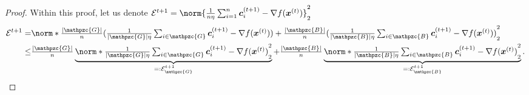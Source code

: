 \documentclass{article}
\newcommand{\gset}{\ensuremath{{\mathpzc{G}}}}
\newcommand{\bset}{\ensuremath{{\mathpzc{B}}}}
\begin{document}
\begin{proof}
  Within this proof, let us denote $\cE^{t+1}=\norm{ \tfrac{1}{n\eta} \tsum_{i=1}^n \cc_i^{(t+1)}  - \nabla f(\xx^{(t)}) }_2^2$
  \begin{align*}
    \cE^{t+1} = & \norm*{ \tfrac{|\gset|}{n} ( \tfrac{1}{|\gset|\eta} \tsum_{i\in\gset} \cc_i^{(t+1)}  - \nabla f(\xx^{(t)})) + \tfrac{|\bset|}{n} (\tfrac{1}{|\bset|\eta}\tsum_{i\in\bset} \cc_i^{(t+1)}  - \nabla f(\xx^{(t)})) }_2^2 \\
    \le         & \tfrac{|\gset|}{n} \underbrace{ \norm*{ \tfrac{1}{|\gset|\eta}  \tsum_{i\in\gset} \cc_i^{(t+1)}  - \nabla f(\xx^{(t)})  }_2^2 }_{=: \cE^{t+1}_{\gset} }
    + \tfrac{|\bset|}{n} \underbrace{\norm*{ \tfrac{1}{|\bset|\eta} \tsum_{i\in\bset} \cc_i^{(t+1)}  - \nabla f(\xx^{(t)}) }_2^2 }_{=: \cE^{t+1}_{\bset} }.
  \end{align*}


\end{proof}
\end{document}
